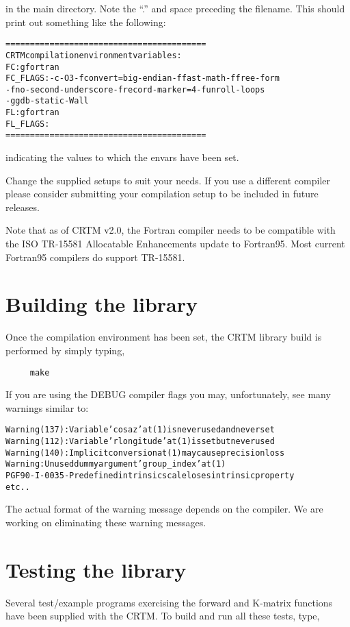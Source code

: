 in the main directory. Note the ``.'' and space preceding the filename. This should print out something like the following:
\begin{alltt}
  =========================================
   CRTM compilation environment variables:
     FC:       gfortran
     FC_FLAGS:  -c  -O3  -fconvert=big-endian  -ffast-math  -ffree-form
                -fno-second-underscore  -frecord-marker=4  -funroll-loops
                -ggdb  -static  -Wall 
     FL:       gfortran
     FL_FLAGS: 
  =========================================\end{alltt}

indicating the values to which the envars have been set.

Change the supplied setups to suit your needs. If you use a different compiler please consider submitting your compilation setup to be included in future releases.

Note that as of CRTM v2.0, the Fortran compiler needs to be compatible with the ISO TR-15581 Allocatable Enhancements update to Fortran95. Most current Fortran95 compilers do support TR-15581.


\section{Building the library}
Once the compilation environment has been set, the CRTM library build is performed by simply typing,

\begin{verbatim}     make\end{verbatim}
   
If you are using the DEBUG compiler flags you may, unfortunately, see many warnings similar to:
\begin{alltt}
  Warning (137): Variable 'cosaz' at (1) is never used and never set
  Warning (112): Variable 'rlongitude' at (1) is set but never used
  Warning (140): Implicit conversion at (1) may cause precision loss
  Warning: Unused dummy argument 'group_index' at (1)   
  PGF90-I-0035-Predefined intrinsic scale loses intrinsic property
  etc..\end{alltt}

The actual format of the warning message depends on the compiler. We are working on eliminating these warning messages.


\section{Testing the library}
Several test/example programs exercising the forward and K-matrix functions have been supplied with the CRTM. To build and run all these tests, type,

